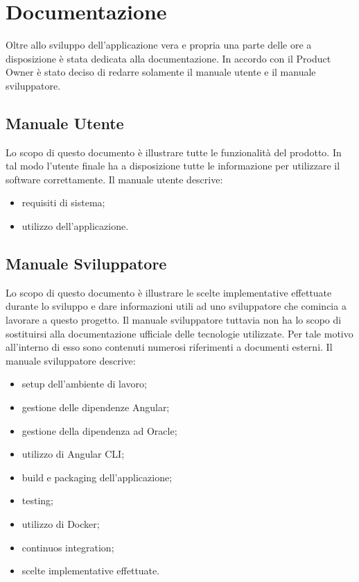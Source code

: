 \section{Documentazione}
Oltre allo sviluppo dell'applicazione vera e propria una parte delle ore a disposizione è stata dedicata alla documentazione. In accordo con il Product Owner è stato deciso di redarre solamente il manuale utente e il manuale sviluppatore.

\subsection{Manuale Utente}
Lo scopo di questo documento è illustrare tutte le funzionalità del prodotto. In tal modo l'utente finale ha a disposizione tutte le informazione per utilizzare il software correttamente.
Il manuale utente descrive:
\begin{itemize}
    \item requisiti di sistema;
    \item utilizzo dell'applicazione.
\end{itemize}

\subsection{Manuale Sviluppatore}
Lo scopo di questo documento è illustrare le scelte implementative effettuate durante lo sviluppo e dare informazioni utili ad uno sviluppatore che comincia a lavorare a questo progetto.
Il manuale sviluppatore tuttavia non ha lo scopo di sostituirsi alla documentazione ufficiale delle tecnologie utilizzate. Per tale motivo all'interno di esso sono contenuti numerosi riferimenti a documenti esterni.
Il manuale sviluppatore descrive:
\begin{itemize}
    \item setup dell'ambiente di lavoro;
    \item gestione delle dipendenze Angular;
    \item gestione della dipendenza ad Oracle;
    \item utilizzo di Angular CLI;
    \item build e packaging dell'applicazione;
    \item testing;
    \item utilizzo di Docker;
    \item continuos integration;
    \item scelte implementative effettuate.
\end{itemize}

